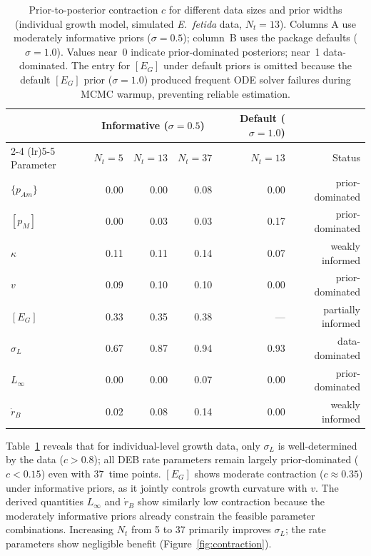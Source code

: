 \documentclass[article,shortnames]{jss}
\newcommand{\pAm}{\{p_{Am}\}}
\newcommand{\pM}{[p_M]}
\newcommand{\EG}{[E_G]}
\begin{document}
\begin{table}[t!]
\centering
\caption{Prior-to-posterior contraction $c$ for different data sizes
  and prior widths (individual growth model, simulated \emph{E.~fetida}
  data, $N_t = 13$).  Columns A use moderately informative priors
  ($\sigma = 0.5$); column~B uses the package defaults
  ($\sigma = 1.0$).  Values near~0 indicate prior-dominated
  posteriors; near~1 data-dominated.  The entry for $\EG$ under
  default priors is omitted because the default $\EG$ prior
  ($\sigma = 1.0$) produced frequent ODE solver failures during
  MCMC warmup, preventing reliable estimation.}
\label{tab:contraction}
\begin{tabular}{lrrrrr}
\toprule
 & \multicolumn{3}{c}{Informative ($\sigma = 0.5$)} &
   Default ($\sigma = 1.0$) & \\
\cmidrule(lr){2-4} \cmidrule(lr){5-5}
Parameter & $N_t = 5$ & $N_t = 13$ & $N_t = 37$ &
  $N_t = 13$ & Status \\
\midrule
$\pAm$          & 0.00 & 0.00 & 0.08 & 0.00 & prior-dominated \\
$\pM$           & 0.00 & 0.03 & 0.03 & 0.17 & prior-dominated \\
$\kappa$        & 0.11 & 0.11 & 0.14 & 0.07 & weakly informed \\
$v$             & 0.09 & 0.10 & 0.10 & 0.00 & prior-dominated \\
$\EG$           & 0.33 & 0.35 & 0.38 & --- & partially informed \\
$\sigma_L$      & 0.67 & 0.87 & 0.94 & 0.93 & data-dominated \\
\midrule
$L_\infty$      & 0.00 & 0.00 & 0.07 & 0.00 & prior-dominated \\
$\dot{r}_B$     & 0.02 & 0.08 & 0.14 & 0.00 & weakly informed \\
\bottomrule
\end{tabular}
\end{table}

Table~\ref{tab:contraction} reveals that for individual-level
growth data, only $\sigma_L$ is well-determined by the data
($c > 0.8$); all DEB rate parameters remain largely
prior-dominated ($c < 0.15$) even with 37~time points.  $\EG$
shows moderate contraction ($c \approx 0.35$) under informative
priors, as it jointly controls growth curvature with $v$.  The
derived quantities $L_\infty$ and $\dot{r}_B$ show similarly low
contraction because the moderately informative priors already
constrain the feasible parameter combinations.  Increasing $N_t$
from 5 to 37 primarily improves $\sigma_L$; the rate parameters
show negligible benefit (Figure~\ref{fig:contraction}).
\end{document}
